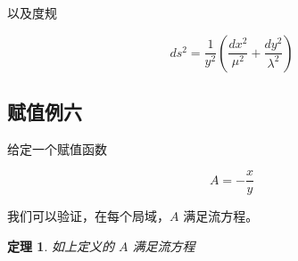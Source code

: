 \documentclass[a4paper,12pt]{article}
\numberwithin{definition}{section}
\numberwithin{lemma}{section}
\numberwithin{proposition}{section}
\newtheorem{theorem}{定理}
\numberwithin{theorem}{section}
\numberwithin{grammar}{section}
\numberwithin{program}{section}
\numberwithin{convention}{section}
\numberwithin{corollary}{section}
\begin{document}
以及度规

\[
ds^2 = \frac{1}{y^2}(\frac{dx^2}{\mu^2} + \frac{dy^2}{\lambda^2})
\]

\subsection{赋值例六}\label{subsec:exmp6}

给定一个赋值函数

\begin{equation}
A = - \frac{x}{y}
\end{equation}

我们可以验证，在每个局域，$A$ 满足流方程。

\begin{theorem}
如上定义的 $A$ 满足流方程
\end{theorem}
\end{document}
